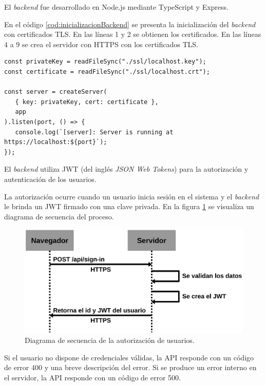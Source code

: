 El \emph{backend} fue desarrollado en Node.js mediante TypeScript  y Express.

En el código \ref{cod:inicializacionBackend} se presenta la inicialización del \emph{backend} con certificados TLS. En las líneas 1 y 2 se obtienen los certificados. En las líneas 4 a 9 se crea el servidor con HTTPS con los certificados TLS.

\begin{lstlisting}[label=cod:inicializacionBackend,caption=Inicialización del \emph{backend} con TLS.]
const privateKey = readFileSync("./ssl/localhost.key");
const certificate = readFileSync("./ssl/localhost.crt");

const server = createServer(
   { key: privateKey, cert: certificate },
   app
).listen(port, () => {
   console.log(`[server]: Server is running at https://localhost:${port}`);
});
\end{lstlisting}

El \emph{backend} utiliza JWT (del inglés \textit{JSON Web Tokens}) para la autorización y autenticación de los usuarios. 

La autorización ocurre cuando un usuario inicia sesión en el sistema y el \emph{backend} le brinda un JWT firmado con una clave privada. En la figura \ref{fig:diagramaSecuenciaAutorizacionUsuarios} se visualiza un diagrama de secuencia del proceso.

\begin{figure}[H]
	\centering
	\includegraphics[width=.9\textwidth]{./Figures/Diagrama de secuencia autorizacion de usuarios.png}
	\caption{Diagrama de secuencia de la autorización de usuarios.}
	\label{fig:diagramaSecuenciaAutorizacionUsuarios}
\end{figure}

Si el usuario no dispone de credenciales válidas, la API responde con un código de error 400 y una breve descripción del error. Si se produce un error interno en el servidor, la API responde con un código de error 500.

